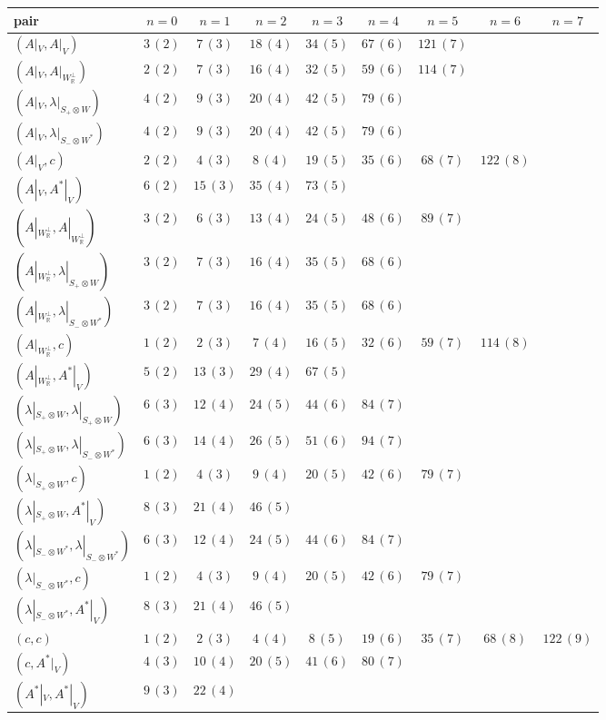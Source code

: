 \begin{tabular}{l|cccccccc}
pair & $n=0$ & $n=1$ & $n=2$ & $n=3$ & $n=4$ & $n=5$ & $n=6$ & $n=7$\\
\hline
$(A|_V,A|_V)$ & $3\,(2)$ & $7\,(3)$ & $18\,(4)$ & $34\,(5)$ & $67\,(6)$ & $121\,(7)$ &  & \\
$(A|_V,A|_{W_{\mathbb R}^\perp})$ & $2\,(2)$ & $7\,(3)$ & $16\,(4)$ & $32\,(5)$ & $59\,(6)$ & $114\,(7)$ &  & \\
$(A|_V,\lambda|_{S_+\otimes W})$ & $4\,(2)$ & $9\,(3)$ & $20\,(4)$ & $42\,(5)$ & $79\,(6)$ &  &  & \\
$(A|_V,\lambda|_{S_-\otimes W^*})$ & $4\,(2)$ & $9\,(3)$ & $20\,(4)$ & $42\,(5)$ & $79\,(6)$ &  &  & \\
$(A|_V,c)$ & $2\,(2)$ & $4\,(3)$ & $8\,(4)$ & $19\,(5)$ & $35\,(6)$ & $68\,(7)$ & $122\,(8)$ & \\
$(A|_V,A^*|_V)$ & $6\,(2)$ & $15\,(3)$ & $35\,(4)$ & $73\,(5)$ &  &  &  & \\
$(A|_{W_{\mathbb R}^\perp},A|_{W_{\mathbb R}^\perp})$ & $3\,(2)$ & $6\,(3)$ & $13\,(4)$ & $24\,(5)$ & $48\,(6)$ & $89\,(7)$ &  & \\
$(A|_{W_{\mathbb R}^\perp},\lambda|_{S_+\otimes W})$ & $3\,(2)$ & $7\,(3)$ & $16\,(4)$ & $35\,(5)$ & $68\,(6)$ &  &  & \\
$(A|_{W_{\mathbb R}^\perp},\lambda|_{S_-\otimes W^*})$ & $3\,(2)$ & $7\,(3)$ & $16\,(4)$ & $35\,(5)$ & $68\,(6)$ &  &  & \\
$(A|_{W_{\mathbb R}^\perp},c)$ & $1\,(2)$ & $2\,(3)$ & $7\,(4)$ & $16\,(5)$ & $32\,(6)$ & $59\,(7)$ & $114\,(8)$ & \\
$(A|_{W_{\mathbb R}^\perp},A^*|_V)$ & $5\,(2)$ & $13\,(3)$ & $29\,(4)$ & $67\,(5)$ &  &  &  & \\
$(\lambda|_{S_+\otimes W},\lambda|_{S_+\otimes W})$ & $6\,(3)$ & $12\,(4)$ & $24\,(5)$ & $44\,(6)$ & $84\,(7)$ &  &  & \\
$(\lambda|_{S_+\otimes W},\lambda|_{S_-\otimes W^*})$ & $6\,(3)$ & $14\,(4)$ & $26\,(5)$ & $51\,(6)$ & $94\,(7)$ &  &  & \\
$(\lambda|_{S_+\otimes W},c)$ & $1\,(2)$ & $4\,(3)$ & $9\,(4)$ & $20\,(5)$ & $42\,(6)$ & $79\,(7)$ &  & \\
$(\lambda|_{S_+\otimes W},A^*|_V)$ & $8\,(3)$ & $21\,(4)$ & $46\,(5)$ &  &  &  &  & \\
$(\lambda|_{S_-\otimes W^*},\lambda|_{S_-\otimes W^*})$ & $6\,(3)$ & $12\,(4)$ & $24\,(5)$ & $44\,(6)$ & $84\,(7)$ &  &  & \\
$(\lambda|_{S_-\otimes W^*},c)$ & $1\,(2)$ & $4\,(3)$ & $9\,(4)$ & $20\,(5)$ & $42\,(6)$ & $79\,(7)$ &  & \\
$(\lambda|_{S_-\otimes W^*},A^*|_V)$ & $8\,(3)$ & $21\,(4)$ & $46\,(5)$ &  &  &  &  & \\
$(c,c)$ & $1\,(2)$ & $2\,(3)$ & $4\,(4)$ & $8\,(5)$ & $19\,(6)$ & $35\,(7)$ & $68\,(8)$ & $122\,(9)$\\
$(c,A^*|_V)$ & $4\,(3)$ & $10\,(4)$ & $20\,(5)$ & $41\,(6)$ & $80\,(7)$ &  &  & \\
$(A^*|_V,A^*|_V)$ & $9\,(3)$ & $22\,(4)$ &  &  &  &  &  & \\
\end{tabular}
